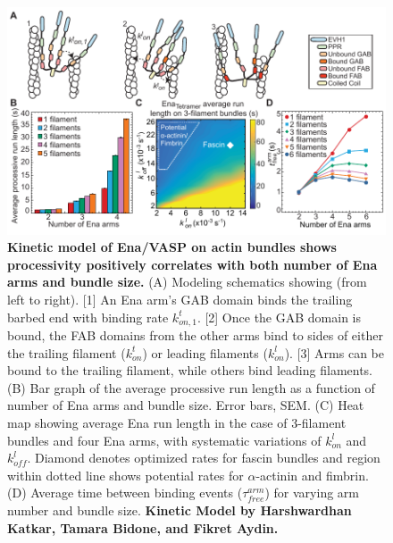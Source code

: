 \begin{figure}
\centering
\includegraphics[width=\textwidth]{img/ch02/Figure_5_elife.pdf}
\caption[Kinetic model of Ena/VASP on actin bundles shows processivity positively correlates with both number of Ena arms and bundle size.]{\textbf{Kinetic model of Ena/VASP on actin bundles shows processivity positively correlates with both number of Ena arms and bundle size.} (A) Modeling schematics showing (from left to right). [1] An Ena arm's GAB domain binds the trailing barbed end with binding rate $k^{t}_{on,1}$. [2] Once the GAB domain is bound, the FAB domains from the other arms bind to sides of either the trailing filament ($k^{t}_{on}$) or leading filaments ($k^{l}_{on}$). [3] Arms can be bound to the trailing filament, while others bind leading filaments. (B) Bar graph of the average processive run length as a function of number of Ena arms and bundle size. Error bars, SEM. (C) Heat map showing average Ena run length in the case of 3-filament bundles and four Ena arms, with systematic variations of $k^{l}_{on}$ and $k^{l}_{off}$. Diamond denotes optimized rates for fascin bundles and region within dotted line shows potential rates for $\alpha$-actinin and fimbrin. (D) Average time between binding events ($\tau_{free}^{arm}$) for varying arm number and bundle size. \textbf{Kinetic Model by Harshwardhan Katkar, Tamara Bidone, and Fikret Aydin.}}
\label{fig:ena-model}
\end{figure}

